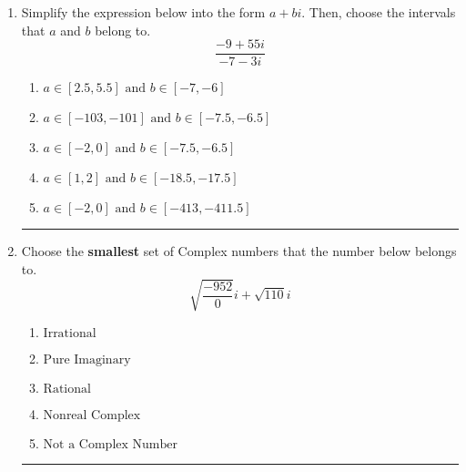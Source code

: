 \documentclass[14pt]{extbook}
\newcommand{\litem}[1]{\item#1\hspace*{-1cm}\rule{\textwidth}{0.4pt}}
\begin{document}
\begin{enumerate}
{\begin{enumerate}[label=\Alph*.]
\end{enumerate} }
\litem{
Simplify the expression below into the form $a+bi$. Then, choose the intervals that $a$ and $b$ belong to.\[ \frac{-9 + 55 i}{-7 - 3 i} \]\begin{enumerate}[label=\Alph*.]
\item \( a \in [2.5, 5.5] \text{ and } b \in [-7, -6] \)
\item \( a \in [-103, -101] \text{ and } b \in [-7.5, -6.5] \)
\item \( a \in [-2, 0] \text{ and } b \in [-7.5, -6.5] \)
\item \( a \in [1, 2] \text{ and } b \in [-18.5, -17.5] \)
\item \( a \in [-2, 0] \text{ and } b \in [-413, -411.5] \)

\end{enumerate} }
\litem{
Choose the \textbf{smallest} set of Complex numbers that the number below belongs to.\[ \sqrt{\frac{-952}{0}} i+\sqrt{110}i \]\begin{enumerate}[label=\Alph*.]
\item \( \text{Irrational} \)
\item \( \text{Pure Imaginary} \)
\item \( \text{Rational} \)
\item \( \text{Nonreal Complex} \)
\item \( \text{Not a Complex Number} \)

\end{enumerate} }
\end{enumerate}
\end{document}
